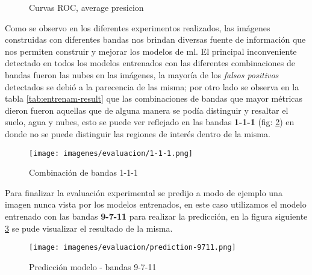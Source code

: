 \begin{figure}[htbp]
\centering
{}
\caption{Curvas ROC, average presicion} \label{fig:Average_precision}
\end{figure}
 
Como se observo en los diferentes experimentos realizados, las imágenes construidas con diferentes bandas nos brindan diversas fuente de información que nos permiten construir y mejorar los modelos de \ac{ml}. El principal inconveniente detectado en todos los modelos entrenados con las diferentes combinaciones de bandas fueron las nubes en las imágenes, la mayoría de los \textit{falsos positivos} detectados se debió a la parecencia de las misma; por otro lado se observa en la tabla \ref{tab:entrenam-result} que las combinaciones de bandas que mayor métricas dieron fueron aquellas que de alguna manera se podía distinguir y resaltar el suelo, agua y nubes, esto se puede ver reflejado en las bandas  \textbf{1-1-1} (fig: \ref{Fig:imagen_banda_111}) en donde no se puede distinguir las regiones de interés dentro de la misma. 
 
 \begin{figure}[H]\centering
  \texttt{[image: imagenes/evaluacion/1-1-1.png]}
  \caption{Combinación de bandas 1-1-1} \label{Fig:imagen_banda_111}
\end{figure}
 
Para finalizar la evaluación experimental se predijo a modo de ejemplo una imagen nunca vista por los modelos entrenados, en este caso utilizamos el modelo entrenado con las bandas \textbf{9-7-11} para realizar la predicción, en la figura siguiente  \ref{Fig: TP} se pude visualizar el resultado de la misma.

\begin{figure}[H]\centering
  \texttt{[image: imagenes/evaluacion/prediction-9711.png]}
  \caption{Predicción modelo - bandas 9-7-11} \label{Fig: TP}
\end{figure}














